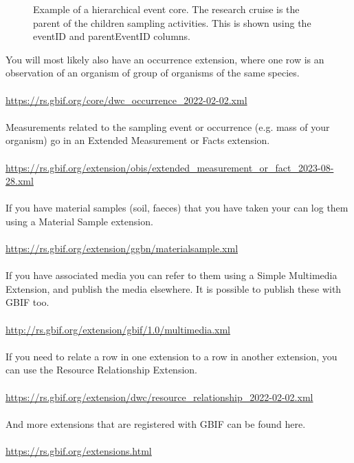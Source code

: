 \documentclass[a4paper,english, 11pt]{article}
\begin{document}
\begin{figure}[htb]
    \caption{\label{fig:eventcore}
        Example of a hierarchical event core. The research cruise is the parent of the children sampling activities. This is shown using the eventID and parentEventID columns. 
    }
\end{figure}

You will most likely also have an occurrence extension, where one row is an observation of an organism of group of organisms of the same species.
\\
\\
\url{https://rs.gbif.org/core/dwc_occurrence_2022-02-02.xml}
\\
\\
Measurements related to the sampling event or occurrence (e.g. mass of your organism) go in an Extended Measurement or Facts extension.
\\
\\
\url{https://rs.gbif.org/extension/obis/extended_measurement_or_fact_2023-08-28.xml}
\\
\\
If you have material samples (soil, faeces) that you have taken your can log them using a Material Sample extension.
\\
\\
\url{https://rs.gbif.org/extension/ggbn/materialsample.xml}
\\
\\
If you have associated media you can refer to them using a Simple Multimedia Extension, and publish the media elsewhere. It is possible to publish these with GBIF too.
\\
\\
\url{http://rs.gbif.org/extension/gbif/1.0/multimedia.xml}
\\
\\
If you need to relate a row in one extension to a row in another extension, you can use the Resource Relationship Extension.
\\
\\
\url{https://rs.gbif.org/extension/dwc/resource_relationship_2022-02-02.xml}
\\
\\
And more extensions that are registered with GBIF can be found here.
\\
\\
\url{https://rs.gbif.org/extensions.html}
\end{document}
